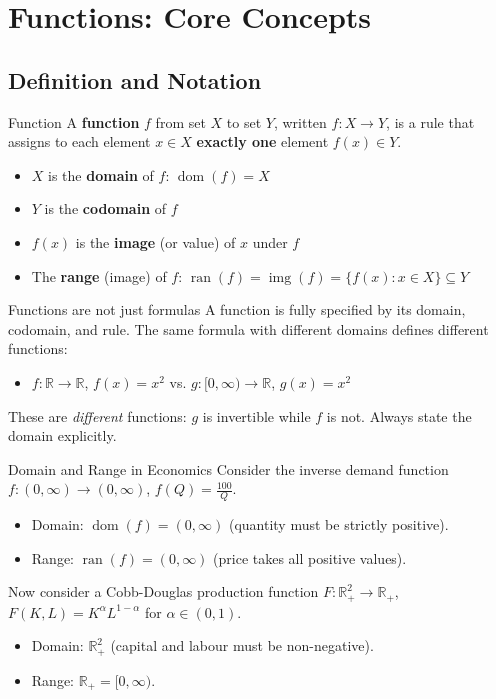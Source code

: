 \documentclass[12pt, a4paper]{article}
\theoremstyle{definition}
\newcommand{\R}{\mathbb{R}}
\DeclareMathOperator{\dom}{dom}
\DeclareMathOperator{\ran}{ran}
\DeclareMathOperator{\img}{img}
\begin{document}
\section{Functions: Core Concepts}

\subsection{Definition and Notation}

\begin{defbox}{Function}
A \textbf{function} $f$ from set $X$ to set $Y$, written $f: X \to Y$, is a rule that assigns to each element $x \in X$ \textbf{exactly one} element $f(x) \in Y$.

\begin{itemize}
  \item $X$ is the \textbf{domain} of $f$: $\dom(f) = X$
  \item $Y$ is the \textbf{codomain} of $f$
  \item $f(x)$ is the \textbf{image} (or value) of $x$ under $f$
  \item The \textbf{range} (image) of $f$: $\ran(f) = \img(f) = \{f(x) : x \in X\} \subseteq Y$
\end{itemize}
\end{defbox}

\begin{warnbox}{Functions are not just formulas}
A function is fully specified by its domain, codomain, and rule. The same formula with different domains defines different functions:
\begin{itemize}
  \item $f: \R \to \R$, $f(x) = x^2$ \hspace{1em}vs.\hspace{1em} $g: [0,\infty) \to \R$, $g(x) = x^2$
\end{itemize}
These are \textit{different} functions: $g$ is invertible while $f$ is not. Always state the domain explicitly.
\end{warnbox}

\begin{exbox}{Domain and Range in Economics}
Consider the inverse demand function $f: (0, \infty) \to (0, \infty)$, $f(Q) = \frac{100}{Q}$.
\begin{itemize}
  \item Domain: $\dom(f) = (0,\infty)$ (quantity must be strictly positive).
  \item Range: $\ran(f) = (0, \infty)$ (price takes all positive values).
\end{itemize}
Now consider a Cobb-Douglas production function $F: \R^2_+ \to \R_+$,
$F(K, L) = K^\alpha L^{1-\alpha}$ for $\alpha \in (0,1)$.
\begin{itemize}
  \item Domain: $\R^2_+$ (capital and labour must be non-negative).
  \item Range: $\R_+ = [0,\infty)$.
\end{itemize}
\end{exbox}
\end{document}
